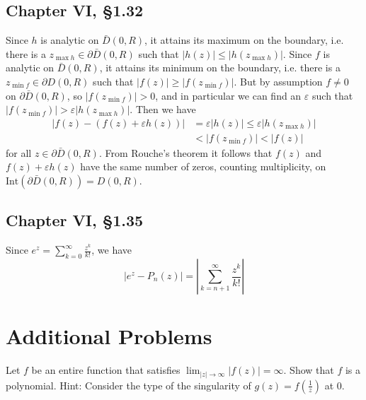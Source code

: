 \documentclass{article}
\newcounter{Problem}
\newenvironment{Problem}{\begin{Exercise}[name={Problem},
                                          counter={Problem}]}
                        {\end{Exercise}}
\begin{document}
\subsection*{Chapter VI, \S1.32}
Since $h$ is analytic on $\bar{D}(0, R)$, it attains its maximum on
the boundary, i.e. there is a $z_{\max h} \in \partial \bar{D} (0, R)$
such that $|h(z)| \leq |h(z_{\max h})|$. Since $f$ is analytic on $\bar{D}(0, R)$,
it attains its minimum on the boundary, i.e. there is a 
$z_{\min f} \in \partial D(0, R)$ such that $|f(z)| \geq |f(z_{\min f})|$. But by 
assumption $f \neq 0$ on $\partial \bar{D}(0, R)$, so 
$|f(z_{\min f})| > 0$, and in particular we can find an $\varepsilon$ 
such that $|f(z_{\min f})| > \varepsilon |h(z_{\max h})|$. Then
we have
\begin{align*}
      |f(z) - (f(z) + \varepsilon h(z))| 
&=    \varepsilon |h(z)| 
\leq  \varepsilon |h(z_{\max h})| \\
&<     |f(z_{\min f})|
 <     |f(z)|
\end{align*}
for all $z \in \partial \bar{D}(0, R)$. From Rouche's theorem it follows that
$f(z)$ and $f(z) + \varepsilon h(z)$ have the same number of zeros, counting
multiplicity, on 
$\mathrm{Int}(\partial\bar{D}(0, R)) = D(0, R)$.

\subsection*{Chapter VI, \S1.35}
Since $e^z = \sum_{k=0}^\infty \frac{z^k}{k!}$, we have
$$
  \left|e^z - P_n(z)\right|
= \left|\sum_{k=n+1}^\infty \frac{z^k}{k!}\right|
$$


\section{Additional Problems}
\begin{Problem}
Let $f$ be an entire function that satisfies
$\lim_{|z| \to \infty} |f(z)| = \infty$. Show that $f$ is a polynomial.
Hint: Consider the type of the singularity of $g(z) = f(\frac{1}{z})$
at 0.
\end{Problem}
\end{document}
